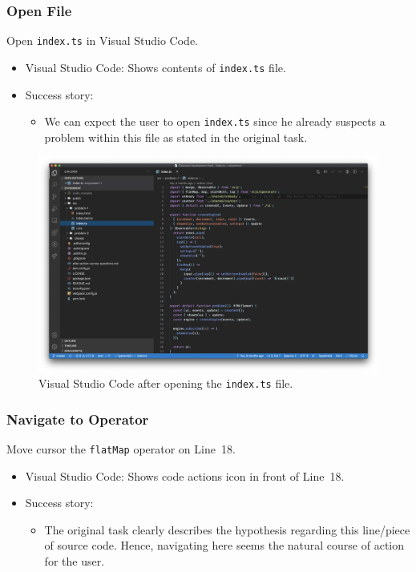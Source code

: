 \documentclass[sigplan,screen,nonacm,review]{acmart}
\begin{document}
\subsubsection{Open File}
Open \texttt{index.ts} in Visual Studio Code.

\begin{itemize}
	\item Visual Studio Code: Shows contents of \texttt{index.ts} file.
	\item Success story:
	      \begin{itemize}
	      	\item We can expect the user to open \texttt{index.ts} since he already suspects a problem within this file as stated in the original task.
	      \end{itemize}
\end{itemize}

\begin{figure}[ht]
	\centering
	\includegraphics[width=\columnwidth]{walkthrough-screenshots/step1.png}
	\Description{}
	\caption{Visual Studio Code after opening the \texttt{index.ts} file.}
	\label{fig:walkthrough-screesnhot-step-1}
\end{figure}


\subsubsection{Navigate to Operator}
Move cursor the \texttt{flatMap} operator on Line~18.

\begin{itemize}
	\item Visual Studio Code: Shows code actions icon in front of Line~18.
	\item Success story:
	      \begin{itemize}
	      	\item The original task clearly describes the hypothesis regarding this line/piece of source code. Hence, navigating here seems the natural course of action for the user.
	      \end{itemize}
\end{itemize}
\end{document}
